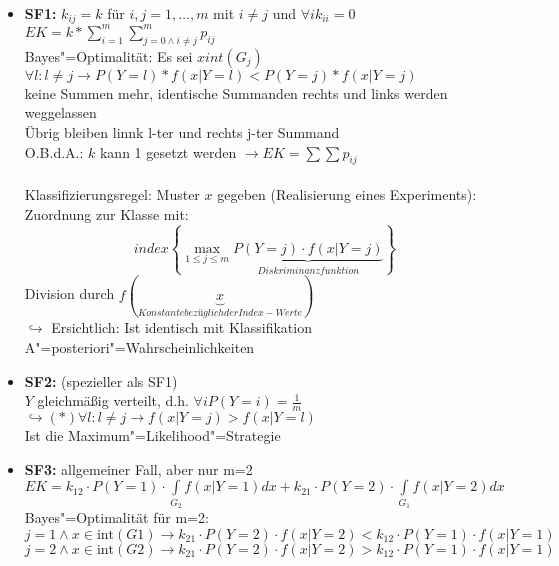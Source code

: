 \documentclass[a4paper,12pt]{scrreprt}
\newcommand{\itemd}[1]{\item{\textbf{#1}} }
\begin{document}
\begin{itemize}
	\itemd{SF1:}$k_{ij}=k$ für $i,j=1,\dots,m$ mit $i\not=j$ und $\forall i k_{ii} = 0 $\\
		$EK=k*\sum\limits_{i=1}^m\sum\limits^m_{j=0\land i\not=j}p_{ij}$\\
		Bayes"=Optimalität: Es sei $x int(G_j)$\\
		$\forall l: l\not=j\to P(Y=l)*f(x|Y=l)<P(Y=j)*f(x|Y=j)$\\
		keine Summen mehr, identische Summanden rechts und links werden weggelassen\\
		Übrig bleiben linnk l-ter und rechts j-ter Summand\\
		O.B.d.A.: $k$ kann 1 gesetzt werden $ \rightarrow  EK = \sum \sum p_{ij} $\\
		\\
		Klassifizierungsregel: Muster $x$ gegeben (Realisierung eines Experiments):\\
		Zuordnung zur Klasse mit: 
		$$index\left\{ \max\limits_{1\le j\le m} \underbrace{P(Y=j)\cdot f(x|Y=j)}_{Diskriminanzfunktion} \right\}$$
		Division durch $f(\underbrace{x}_{Konstante bezüglich der Index-Werte})$\\
		$ \hookrightarrow$ Ersichtlich: Ist identisch mit Klassifikation A"=posteriori"=Wahrscheinlichkeiten
	\itemd{SF2:}(spezieller als SF1)\\
		$Y$ gleichmäßig verteilt, d.h. $ \forall i P(Y=i)=\frac{1}{m}$\\
		$ \hookrightarrow (*) \forall l: l\not=j\to f(x|Y=j)>f(x|Y=l)$\\
		Ist die Maximum"=Likelihood"=Strategie
	\itemd{SF3:} allgemeiner Fall, aber nur m=2\\
		$EK=k_{12}\cdot
		P(Y=1)\cdot\int\limits_{G_2}f(x|Y=1)dx+k_{21}\cdot
		P(Y=2)\cdot\int\limits_{G_1}f(x|Y=2)dx$\\
		Bayes"=Optimalität für m=2:\\
		$$j=1\land x\in \text{int}(G1)\to k_{21}\cdot P(Y=2)\cdot
		f(x|Y=2)< k_{12}\cdot P(Y=1)\cdot f(x|Y=1) $$
		$$j=2\land x\in \text{int}(G2)\to k_{21}\cdot P(Y=2)\cdot
		f(x|Y=2)> k_{12}\cdot P(Y=1)\cdot f(x|Y=1) $$
		

\end{itemize}
\end{document}
